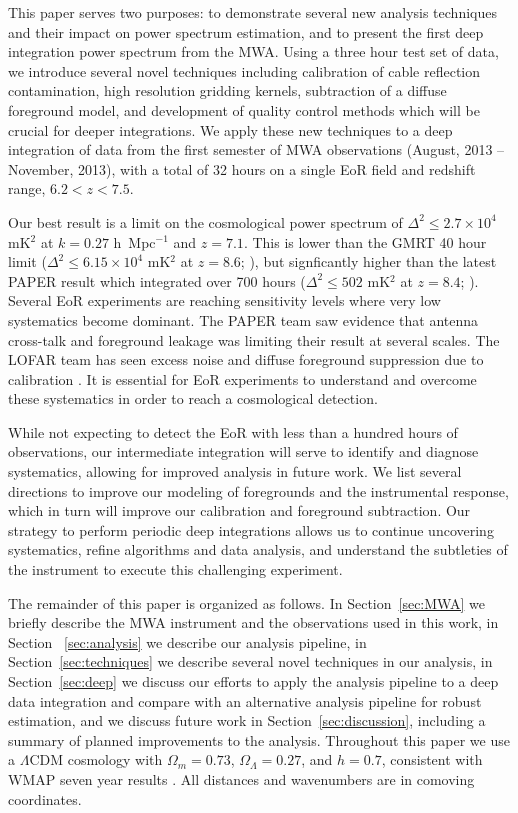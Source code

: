 \documentclass[iop]{emulateapj}
\begin{document}
This paper serves two purposes: to demonstrate several new analysis techniques and their 
impact on power spectrum estimation, and to present the first deep integration 
power spectrum from the MWA. Using a three hour test set of data, we introduce several 
novel techniques including calibration of cable reflection contamination, high resolution 
gridding kernels, subtraction of a diffuse foreground model, and development of quality 
control methods which will be crucial for deeper integrations. We apply these new 
techniques to a deep integration of data from the first semester of MWA observations 
(August, 2013 -- November, 2013), with a total of 32 hours on a single EoR field and redshift range, $6.2<z<7.5$.

Our best result is a limit on the cosmological power spectrum of $\Delta^2 \leq 2.7 \times 10^4$ 
mK$^2$ at $k=0.27$ h~Mpc$^{-1}$ and $z=7.1$. This is lower than the GMRT 40 hour
limit ($\Delta^2 \le 6.15 \times 10^4$ mK$^2$ at $z=8.6$; \citealt{Paciga:2013}), but 
signficantly higher than the latest PAPER result which 
integrated over 700 hours ($\Delta^2 \le 502$ mK$^2$ at $z=8.4$; \citealt{Ali:2015}).
Several EoR experiments are reaching sensitivity levels where very low systematics
become dominant. The PAPER team saw evidence that antenna cross-talk and foreground
leakage was limiting their result at several scales. The LOFAR team has seen excess noise
and diffuse foreground suppression due to calibration \citep{Patil:2016}. It is essential
for EoR experiments to understand and overcome these systematics in order to reach
a cosmological detection.

While not expecting to detect the EoR with less than a hundred hours of observations, our 
intermediate integration will serve to identify and diagnose systematics, allowing for 
improved analysis in future work. We list several directions to improve our modeling of
foregrounds and the instrumental response, which in turn will improve our calibration
and foreground subtraction. Our strategy to perform periodic deep integrations allows us
to continue uncovering systematics, refine algorithms and data analysis, and understand
the subtleties of the instrument to execute this challenging experiment.

The remainder of this paper is organized as follows. In Section~\ref{sec:MWA} we briefly 
describe the MWA instrument and the observations used in this work, in Section~
\ref{sec:analysis} we describe our analysis pipeline, in Section~\ref{sec:techniques} we 
describe several novel techniques in our analysis, in Section~\ref{sec:deep} we discuss our 
efforts to apply the analysis pipeline to a deep data integration and compare with an alternative analysis pipeline for robust estimation, and we discuss future work 
in Section~\ref{sec:discussion}, including a summary of planned improvements
to the analysis. Throughout this paper we use a $\Lambda$CDM 
cosmology with $\Omega_m=0.73$, $\Omega_\Lambda=0.27$, and $h = 0.7$, consistent 
with WMAP seven year results \citep{Komatsu:2011}. All distances and wavenumbers are in 
comoving coordinates.
\end{document}
